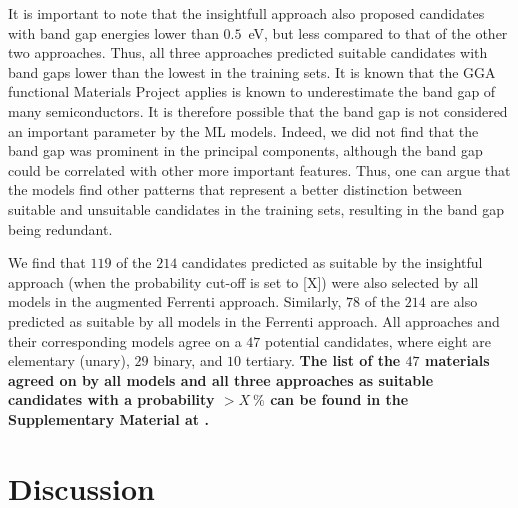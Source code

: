 \documentclass[superscriptaddress,unsortedaddress,
 amsmath,amssymb,
 aps,
]{revtex4-2}
\newcommand{\oliver}[1]{\textcolor{violet}{#1}}
\begin{document}
It is important to note that the insightfull approach also proposed candidates with band gap energies lower than $0.5$~eV, but less compared to that of the other two approaches. Thus, all three approaches predicted suitable candidates with band gaps lower than the lowest in the training sets. 
It is known that the GGA functional Materials Project applies is known to underestimate the band gap of many semiconductors. 
It is therefore possible that the band gap is not considered an important parameter by the ML models. 
Indeed, we did not find that the band gap was prominent in the principal components, although the band gap could be correlated with other more important features. 
Thus, one can argue that the models find other patterns that represent a better distinction between suitable and unsuitable candidates in the training sets, resulting in the band gap being redundant.

We find that $119$ of the $214$ candidates predicted as suitable by the insightful approach (when the probability cut-off is set to [X]) were also selected by all models in the augmented Ferrenti approach. 
Similarly, $78$ of the $214$ are also predicted as suitable by all models in the Ferrenti approach. All approaches and their corresponding models agree on a $47$ potential candidates, where eight are elementary (unary), $29$ binary, and $10$ tertiary.
\textbf{The list of the $47$ materials agreed on by all models and all three approaches as suitable candidates with a probability $> X \ \%$ can be found in the Supplementary Material at \cite{supplementary}.} 


\section*{Discussion} 

\end{document}
